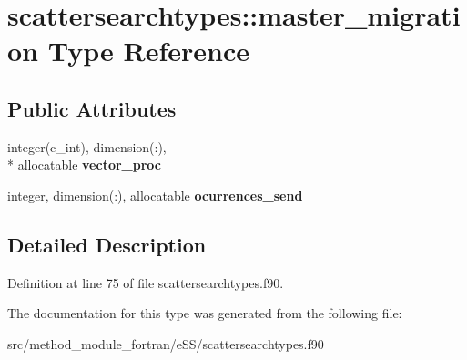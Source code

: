 \hypertarget{structscattersearchtypes_1_1master__migration}{\section{scattersearchtypes\-:\-:master\-\_\-migration Type Reference}
\label{structscattersearchtypes_1_1master__migration}
}
\subsection*{Public Attributes}
\begin{DoxyCompactItemize}
\item 
\hypertarget{structscattersearchtypes_1_1master__migration_acddca771e6e31e1dfda1f2173880fa62}{integer(c\-\_\-int), dimension(\-:), \\*
allocatable {\bfseries vector\-\_\-proc}}\label{structscattersearchtypes_1_1master__migration_acddca771e6e31e1dfda1f2173880fa62}

\item 
\hypertarget{structscattersearchtypes_1_1master__migration_a22165a4497a71804d551bf11c19ff3a2}{integer, dimension(\-:), allocatable {\bfseries ocurrences\-\_\-send}}\label{structscattersearchtypes_1_1master__migration_a22165a4497a71804d551bf11c19ff3a2}

\end{DoxyCompactItemize}


\subsection{Detailed Description}


Definition at line 75 of file scattersearchtypes.\-f90.



The documentation for this type was generated from the following file\-:\begin{DoxyCompactItemize}
\item 
src/method\-\_\-module\-\_\-fortran/e\-S\-S/scattersearchtypes.\-f90\end{DoxyCompactItemize}
